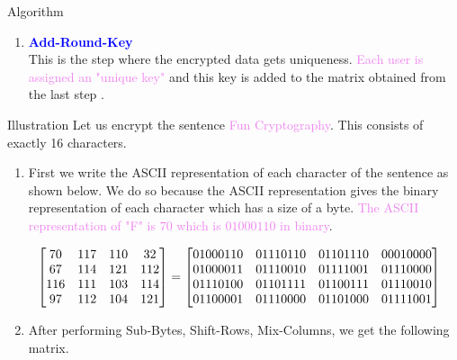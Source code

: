 \documentclass{beamer}
\begin{document}
\begin{frame}[allowframebreaks]{Algorithm}
\begin{enumerate}
    \vspace{5mm}

  \item \textbf{\textcolor{blue}{Add-Round-Key}}\\
This is the step where the encrypted data gets uniqueness. \textcolor{violet}{Each user is assigned an "unique key"} and this key is added to the matrix obtained from the last step \cite{aes}.
  \end{enumerate}
\end{frame}

\begin{frame}[allowframebreaks]{Illustration}
  Let us encrypt the sentence \textcolor{violet}{Fun Cryptography}. This consists of exactly 16 characters.\vspace{2mm}

\begin{enumerate}
\item First we write the ASCII representation of each character of the sentence as shown below. We do so because the ASCII representation gives the binary representation of each character which has a size of a byte. \textcolor{violet}{The ASCII representation of "F" is \(70\) which is \(01000110\) in binary}.\vspace{2mm}

  \[\hspace{-3mm} \begin{bmatrix}
      70 & 117 & 110 & 32 \\
      67 & 114 & 121 & 112\\
      116 & 111 & 103 & 114 \\
      97 & 112 & 104 & 121
    \end{bmatrix}=
    \begin{bmatrix}
      01000110 & 01110110 & 01101110 & 00010000 \\
      01000011 & 01110010 & 01111001 & 01110000\\
      01110100 & 01101111 & 01100111 & 01110010 \\
      01100001 & 01110000 & 01101000 & 01111001
    \end{bmatrix}
  \]
\item After performing Sub-Bytes, Shift-Rows, Mix-Columns, we get the following matrix.


\end{enumerate}
\end{frame}
\end{document}
